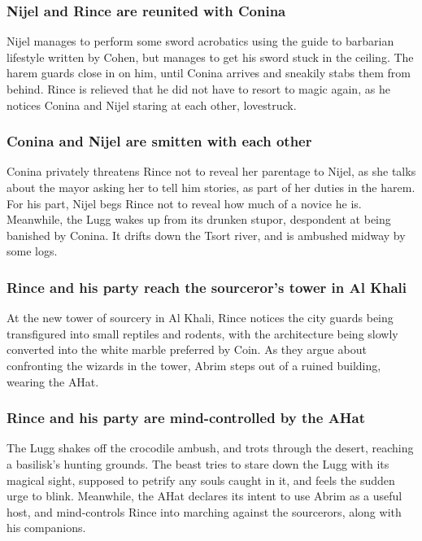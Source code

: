 \subsubsection{\Gls{Nijel} and \Gls{Rince} are reunited with \Gls{Conina}}
\Gls{Nijel} manages to perform some sword acrobatics using the guide to barbarian lifestyle written
by \Gls{Cohen}, but manages to get his sword stuck in the ceiling. The harem guards close in on
him, until \Gls{Conina} arrives and sneakily stabs them from behind. \Gls{Rince} is relieved that
he did not have to resort to magic again, as he notices \Gls{Conina} and \Gls{Nijel} staring at
each other, lovestruck.

\subsubsection{\Gls{Conina} and \Gls{Nijel} are smitten with each other}
\Gls{Conina} privately threatens \Gls{Rince} not to reveal her parentage to \Gls{Nijel}, as she
talks about the mayor asking her to tell him stories, as part of her duties in the harem. For his
part, \Gls{Nijel} begs \Gls{Rince} not to reveal how much of a novice he is. Meanwhile, the
\Gls{Lugg} wakes up from its drunken stupor, despondent at being banished by \Gls{Conina}. It
drifts down the Tsort river, and is ambushed midway by some logs.

\subsubsection{\Gls{Rince} and his party reach the sourceror's tower in Al Khali}
At the new tower of sourcery in Al Khali, \Gls{Rince} notices the city guards being transfigured
into small reptiles and rodents, with the architecture being slowly converted into the white marble
preferred by \Gls{Coin}. As they argue about confronting the wizards in the tower, \Gls{Abrim}
steps out of a ruined building, wearing the \Gls{AHat}.

\subsubsection{\Gls{Rince} and his party are mind-controlled by the \Gls{AHat}}
The \Gls{Lugg} shakes off the crocodile ambush, and trots through the desert, reaching a basilisk's
hunting grounds. The beast tries to stare down the \Gls{Lugg} with its magical sight, supposed to
petrify any souls caught in it, and feels the sudden urge to blink. Meanwhile, the \Gls{AHat}
declares its intent to use \Gls{Abrim} as a useful host, and mind-controls \Gls{Rince} into
marching against the sourcerors, along with his companions.

